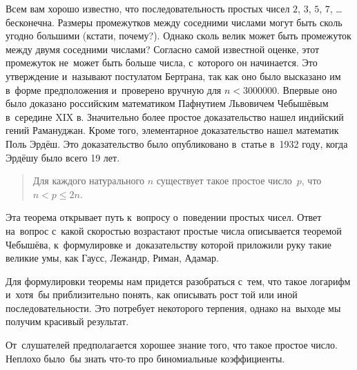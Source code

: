 



Всем вам хорошо известно, что последовательность простых чисел
$2$, $3$, $5$, $7$, {\ldots} бесконечна.
Размеры промежутков между соседними числами могут быть сколь угодно большими
(кстати, почему?).
Однако сколь велик может быть промежуток между двумя соседними числами?
Согласно самой известной оценке, этот промежуток не~может быть больше числа,
с~которого он начинается.
Это утверждение и~называют постулатом Бертрана, так как оно было высказано им
в~форме предположения и~проверено вручную для $n < 3000000$.
Впервые оно было доказано российским математиком Пафнутием Львовичем Чебышёвым
в~середине XIX в.
Значительно более простое доказательство нашел индийский гений Рамануджан.
Кроме того, элементарное доказательство нашел математик Поль Эрдёш.
Это доказательство было опубликовано в~статье в~1932 году, когда Эрдёшу было
всего 19 лет.

\begin{quote}

Для каждого натурального $n$ существует такое простое число~$p$, что
$n < p \leq 2 n$.

\end{quote}

Эта теорема открывает путь к~вопросу о~поведении простых чисел.
Ответ на~вопрос с~какой скоростью возрастают простые числа
описывается теоремой Чебышёва, к~формулировке и~доказательству которой
приложили руку такие великие умы, как Гаусс, Лежандр, Риман, Адамар.

Для формулировки теоремы нам придется разобраться с~тем, что такое логарифм
и~хотя~бы приблизительно понять, как описывать рост той или иной
последовательности.
Это потребует некоторого терпения, однако на~выходе мы получим красивый
результат.

От~слушателей предполагается хорошее знание того, что такое простое число.
Неплохо было~бы знать что-то про биномиальные коэффициенты.

